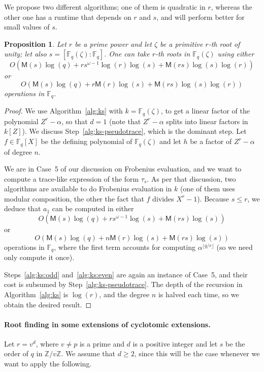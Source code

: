 \documentclass{mcom-l}
\theoremstyle{plain}
\newtheorem{proposition}[theorem]{Proposition}
\theoremstyle{definition}
\newcommand{\Z}{\ensuremath{\mathbb{Z}}}
\newcommand{\F}{\ensuremath{\mathbb{F}}}
\newcommand{\MM}{\ensuremath{\mathsf{M}}}
\newcounter{algorithm}
\begin{document}
We propose two different algorithms; one of them is quadratic in $r$,
whereas the other one has a runtime that depends on $r$ and $s$,
and will perform better for small values of $s$.

\begin{proposition}
  \label{prop:root-fpz}
  Let $r$ be a prime power and let $\zeta$ be a primitive $r$-th root of unity; let also $s = 
  [\F_q(\zeta): \F_q]$. One can take $r$-th roots in 
  $\F_q(\zeta)$ using either 
  $$O(\MM(s)\log(q) + rs^{\omega-1}\log(r)\log(s) + \MM(rs)\log(s)\log(r))$$
  or
  $$O(\MM(s)\log(q) + r\MM(r)\log(s) + \MM(rs)\log(s)\log(r))$$ operations in $\F_q$. 
\end{proposition}
\begin{proof}
We use Algorithm~\ref{alg:ks} with $k=\F_q(\zeta)$, to get a linear
factor of the polynomial $Z^r-\alpha$, so that $d=1$ (note that
$Z^r-\alpha$ splits into linear factors in $k[Z]$). We discuss
Step~\ref{alg:ks-pseudotrace}, which is the dominant step. Let $f \in
\F_q[X]$ be the defining polynomial of $\F_q(\zeta)$ and let $h$ be a
factor of $Z^r-\alpha$ of degree $n$. 

We are in Case~5 of our discussion on Frobenius evaluation, and we
want to compute a trace-like expression of the form $\tau_s$. As per
that discussion, two algorithms are available to do Frobenius
evaluation in $k$ (one of them uses modular composition, the other the
fact that $f$ divides $X^r-1$). Because $s \le r$, we deduce that
$a_1$ can be computed in either
$$O(\MM(s)\log(q) + rs^{\omega-1}\log(s) + \MM(rs)\log(s))$$
or
$$O(\MM(s)\log(q) + n\MM(r)\log(s) + \MM(rs)\log(s))$$ operations in
$\F_q$, where the first term accounts for computing $\alpha^{\lfloor
  q/r \rfloor}$ (so we need only compute it once).

Steps~\ref{alg:ks:odd} and~\ref{alg:ks:even} are again an instance of
Case~5, and their cost is subsumed by Step~\ref{alg:ks-pseudotrace}.
The depth of the recursion in Algorithm~\ref{alg:ks} is $\log(r)$, and
the degree $n$ is halved each time, so we obtain the desired result.
\end{proof}

\paragraph{\bf Root finding in some extensions of cyclotomic extensions.}
Let $r = v^d$, where $v \ne p$ is a prime and $d$ is a positive
integer and let $s$ be the order of $q$ in $\Z / v\Z$.  We 
assume that $d \ge 2$, since this will be the case whenever we want to
apply the following.
\end{document}
